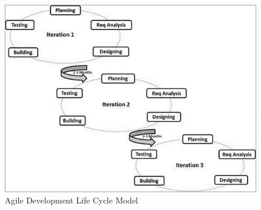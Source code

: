 \begin{figure}[!htb]
\centering
\includegraphics[width=\textwidth]{section02/assets/sdlc_agile_model.jpg}
\caption[Agile Development Life Cycle Model]{\label{Agile Model}Agile Development Life Cycle Model}
\end{figure}


